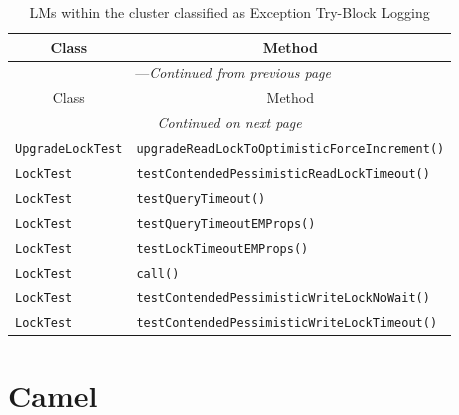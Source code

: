 \begin{center}
\begin{longtable}{ll}
\caption{LMs within the cluster classified as Exception Try-Block Logging}\\
\toprule\multicolumn{1}{c}{Class}&\multicolumn{1}{c}{Method}\\\midrule
\endfirsthead

\multicolumn{2}{c}{\tablename\ \thetable{}---\textit{Continued from previous page}} \\\midrule
\multicolumn{1}{c}{Class}&\multicolumn{1}{c}{Method}\\\midrule
\endhead
\multicolumn{2}{c}{\textit{Continued on next page}}\\\midrule
\endfoot
\bottomrule
\endlastfoot

\lstinline/UpgradeLockTest/&{\lstinline/upgradeReadLockToOptimisticForceIncrement()/}\\
\lstinline/LockTest/&{\lstinline/testContendedPessimisticReadLockTimeout()/}\\
\lstinline/LockTest/&{\lstinline/testQueryTimeout()/}\\
\lstinline/LockTest/&{\lstinline/testQueryTimeoutEMProps()/}\\
\lstinline/LockTest/&{\lstinline/testLockTimeoutEMProps()/}\\
\lstinline/LockTest/&{\lstinline/call()/}\\
\lstinline/LockTest/&{\lstinline/testContendedPessimisticWriteLockNoWait()/}\\
\lstinline/LockTest/&{\lstinline/testContendedPessimisticWriteLockTimeout()/}\\
\end{longtable}
\end{center}

\section{Camel}\label{camel}

